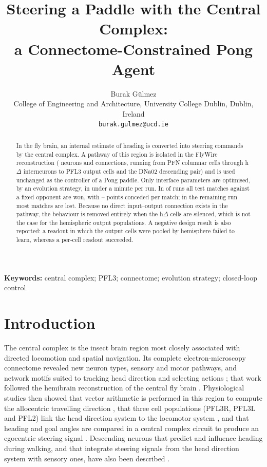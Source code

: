 \documentclass[11pt]{article}
\title{\textbf{Steering a Paddle with the Central Complex:\\a Connectome-Constrained Pong Agent}}
\author{Burak G\"ulmez\\[2pt]
\small College of Engineering and Architecture, University College Dublin, Dublin, Ireland\\
\small \texttt{burak.gulmez@ucd.ie}}
\date{}
\begin{document}
\maketitle

\begin{abstract}
\noindent
In the fly brain, an internal estimate of heading is converted into steering commands by the central
complex. A pathway of this region is isolated in the FlyWire reconstruction (\Neurons{} neurons and
\Edges{} connections, running from PFN columnar cells through h$\Delta$ interneurons to PFL3 output
cells and the DNa02 descending pair) and is used unchanged as the controller of a Pong paddle. Only
\NParams{} interface parameters are optimised, by an evolution strategy, in under a minute per run.
In \NGood{} of \NSeeds{} runs all \TestGames{} test matches against a fixed opponent are won, with
\GoodAgainstMin{}--\GoodAgainstMax{} points conceded per match; in the remaining run most matches are
lost. Because no direct input--output connection exists in the pathway, the behaviour is removed
entirely when the \Intermediates{} h$\Delta$ cells are silenced, which is not the case for the
hemispheric output populations. A negative design result is also reported: a readout in which the
output cells were pooled by hemisphere failed to learn, whereas a per-cell readout succeeded.
\end{abstract}

\textbf{Keywords:} central complex; PFL3; connectome; evolution strategy; closed-loop control

\section{Introduction}
The central complex is the insect brain region most closely associated with directed locomotion and
spatial navigation. Its complete electron-microscopy connectome revealed new neuron types, sensory
and motor pathways, and network motifs suited to tracking head direction and selecting actions
\cite{hulse2021}; that work followed the hemibrain reconstruction of the central fly brain
\cite{scheffer2020}. Physiological studies then showed that vector arithmetic is performed in this
region to compute the allocentric travelling direction \cite{lyu2021}, that three cell populations
(PFL3R, PFL3L and PFL2) link the head direction system to the locomotor system \cite{westeinde2024},
and that heading and goal angles are compared in a central complex circuit to produce an egocentric
steering signal \cite{pires2024}. Descending neurons that predict and influence heading during
walking, and that integrate steering signals from the head direction system with sensory ones, have
also been described \cite{rayshubskiy2025}.
\end{document}

